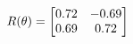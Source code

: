 \documentclass[preview]{standalone}
\begin{document}
\begin{align*}
\special{dvisvgm:raw <g id='unique000'>}R(\theta) = \begin{bmatrix}0.72 & -0.69\\0.69 & 0.72\end{bmatrix}\special{dvisvgm:raw </g>}
\end{align*}
\end{document}
